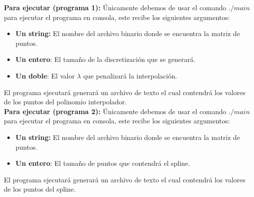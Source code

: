 \documentclass[12pt]{article}
\begin{document}
\textbf{Para ejecutar (programa 1):} Únicamente debemos de usar el comando $./main$ para ejecutar el programa en consola, este recibe los siguientes argumentos:
\begin{itemize}
	\item \textbf{Un string:} El nombre del archivo binario donde se encuentra la matriz de puntos.
	\item \textbf{Un entero}: El tamaño de la discretización que se generará.
	\item \textbf{Un doble}: El valor $\lambda$ que penalizará la interpolación. 
\end{itemize}

El programa ejecutará generará un archivo de texto el cual contendrá los valores de los puntos del polinomio interpolador.\\

\textbf{Para ejecutar (programa 2):} Únicamente debemos de usar el comando $./main$ para ejecutar el programa en consola, este recibe los siguientes argumentos:
\begin{itemize}
	\item \textbf{Un string:} El nombre del archivo binario donde se encuentra la matriz de puntos.
	\item \textbf{Un entero}: El tamaño de puntos que contendrá el spline. 
\end{itemize}

El programa ejecutará generará un archivo de texto el cual contendrá los valores de los puntos del spline.\\
\end{document}
